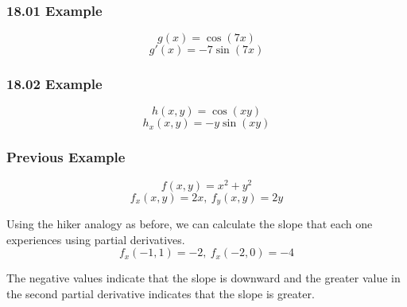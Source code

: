 \documentclass{article}
\begin{document}
\subsubsection{ 18.01 Example }

$$ g(x) = \cos(7x) $$
$$ g'(x) = -7 \sin(7x) $$

\subsubsection{ 18.02 Example }

$$ h(x, y) = \cos(xy) $$
$$ h_{x}(x, y) = -y \sin(xy) $$

\subsubsection{ Previous Example }

$$ f(x, y) = x^{2} + y^{2} $$
$$ f_{x}(x, y) = 2x,\ f_{y}(x, y) = 2y $$

Using the hiker analogy as before, we can calculate the slope that each one
experiences using partial derivatives.
$$ f_{x}(-1, 1) = -2,\ f_{x}(-2, 0) = -4 $$

The negative values indicate that the slope is downward and the greater value in
the second partial derivative indicates that the slope is greater.
\end{document}
